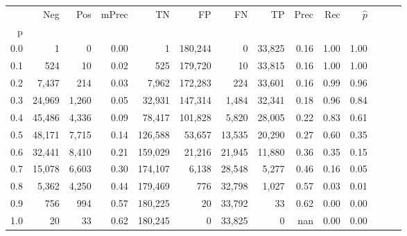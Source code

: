 \begin{tabular}{rrrrrrrrrrrrrr}
\toprule
{} &     Neg &    Pos & mPrec &       TN &       FP &      FN &      TP &  Prec &   Rec & $\hat{p}$ \\
p   &         &        &       &          &          &         &         &       &       &           \\
\midrule
0.0 &       1 &      0 &  0.00 &        1 &  180,244 &       0 &  33,825 &  0.16 &  1.00 &      1.00 \\
0.1 &     524 &     10 &  0.02 &      525 &  179,720 &      10 &  33,815 &  0.16 &  1.00 &      1.00 \\
0.2 &   7,437 &    214 &  0.03 &    7,962 &  172,283 &     224 &  33,601 &  0.16 &  0.99 &      0.96 \\
0.3 &  24,969 &  1,260 &  0.05 &   32,931 &  147,314 &   1,484 &  32,341 &  0.18 &  0.96 &      0.84 \\
0.4 &  45,486 &  4,336 &  0.09 &   78,417 &  101,828 &   5,820 &  28,005 &  0.22 &  0.83 &      0.61 \\
0.5 &  48,171 &  7,715 &  0.14 &  126,588 &   53,657 &  13,535 &  20,290 &  0.27 &  0.60 &      0.35 \\
0.6 &  32,441 &  8,410 &  0.21 &  159,029 &   21,216 &  21,945 &  11,880 &  0.36 &  0.35 &      0.15 \\
0.7 &  15,078 &  6,603 &  0.30 &  174,107 &    6,138 &  28,548 &   5,277 &  0.46 &  0.16 &      0.05 \\
0.8 &   5,362 &  4,250 &  0.44 &  179,469 &      776 &  32,798 &   1,027 &  0.57 &  0.03 &      0.01 \\
0.9 &     756 &    994 &  0.57 &  180,225 &       20 &  33,792 &      33 &  0.62 &  0.00 &      0.00 \\
1.0 &      20 &     33 &  0.62 &  180,245 &        0 &  33,825 &       0 &   nan &  0.00 &      0.00 \\
\bottomrule
\end{tabular}
